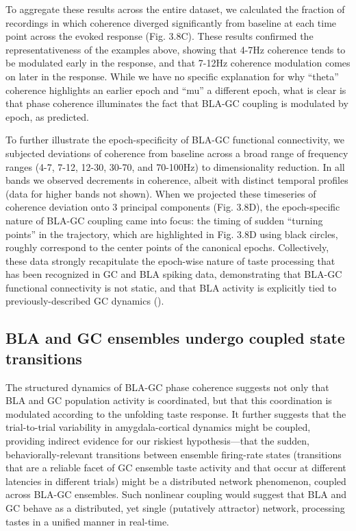 \begin{refsection}
To aggregate these results across the entire dataset, we calculated the fraction of recordings in which coherence diverged significantly from baseline at each time point across the evoked response (Fig. 3.8C). These results confirmed the representativeness of the examples above, showing that 4-7Hz coherence tends to be modulated early in the response, and that 7-12Hz coherence modulation comes on later in the response. While we have no specific explanation for why “theta” coherence highlights an earlier epoch and “mu” a different epoch, what is clear is that phase coherence illuminates the fact that BLA-GC coupling is modulated by epoch, as predicted.

To further illustrate the epoch-specificity of BLA-GC functional connectivity, we subjected deviations of coherence from baseline across a broad range of frequency ranges (4-7, 7-12, 12-30, 30-70, and 70-100Hz) to dimensionality reduction. In all bands we observed decrements in coherence, albeit with distinct temporal profiles (data for higher bands not shown). When we projected these timeseries of coherence deviation onto 3 principal components (Fig. 3.8D), the epoch-specific nature of BLA-GC coupling came into focus: the timing of sudden “turning points” in the trajectory, which are highlighted in Fig. 3.8D using black circles, roughly correspond to the center points of the canonical epochs. Collectively, these data strongly recapitulate the epoch-wise nature of taste processing that has been recognized in GC and BLA spiking data, demonstrating that BLA-GC functional connectivity is not static, and that BLA activity is explicitly tied to previously-described GC dynamics (\cite{lin2021a}).

\subsection{BLA and GC ensembles undergo coupled state transitions}
The structured dynamics of BLA-GC phase coherence suggests not only that BLA and GC population activity is coordinated, but that this coordination is modulated according to the unfolding taste response. It further suggests that the trial-to-trial variability in amygdala-cortical dynamics might be coupled, providing indirect evidence for our riskiest hypothesis—that the sudden, behaviorally-relevant transitions between ensemble firing-rate states (transitions that are a reliable facet of GC ensemble taste activity and that occur at different latencies in different trials) might be a distributed network phenomenon, coupled across BLA-GC ensembles. Such nonlinear coupling would suggest that BLA and GC behave as a distributed, yet single (putatively attractor) network, processing tastes in a unified manner in real-time.


\end{refsection}
